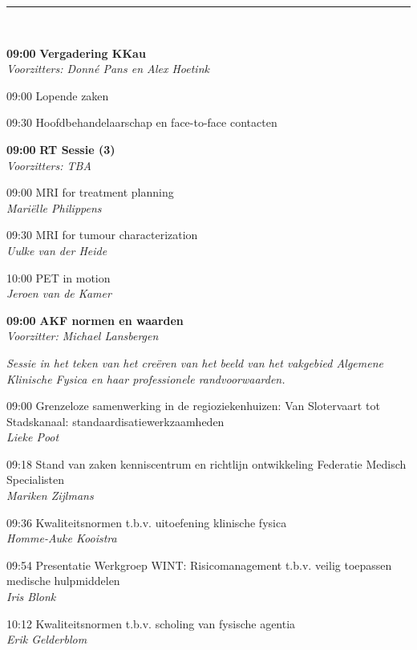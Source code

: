 \documentclass[a4paper,10pt]{report}
\begin{document}
\begin{multicols*}{3}
\vfill
\hrule\vspace{3mm}

\\
\vfill
{}
\begin{packed_enum}
\item[\textbf{09:00}] \textbf{Vergadering KKau}\\\textit{Voorzitters: Donn\'e Pans en Alex Hoetink}
\item[09:00] Lopende zaken
\item[09:30] Hoofdbehandelaarschap en face-to-face contacten 
\end{packed_enum}
\columnbreak

\begin{packed_enum}
\item[\textbf{09:00}] \textbf{RT Sessie (3)}\\\textit{Voorzitters: TBA}
\item[09:00] MRI for treatment planning\\\textit{Mariëlle Philippens}
\item[09:30] MRI for tumour characterization\\\textit{Uulke van der Heide}
\item[10:00] PET in motion\\\textit{Jeroen van de Kamer}
\end{packed_enum}

\vfill
{}
\begin{packed_enum}
\item[\textbf{09:00}] \textbf{AKF normen en waarden}\\\textit{Voorzitter: Michael Lansbergen}
\end{packed_enum}
\textit{Sessie in het teken van het cre\"eren van het beeld van het vakgebied Algemene Klinische Fysica en haar professionele randvoorwaarden.}
\begin{packed_enum}
\item[09:00] Grenzeloze samenwerking in de regioziekenhuizen: Van Slotervaart tot Stadskanaal: standaardisatiewerkzaamheden\\\textit{Lieke Poot}
\item[09:18] Stand van zaken kenniscentrum en richtlijn ontwikkeling Federatie Medisch Specialisten\\\textit{Mariken Zijlmans}
\item[09:36] Kwaliteitsnormen t\@.b\@.v\@. uitoefening klinische fysica\\\textit{Homme-Auke Kooistra} 
\item[09:54] Presentatie Werkgroep WINT: Risicomanagement t\@.b\@.v\@. veilig toepassen medische hulpmiddelen\\\textit{Iris Blonk}
\item[10:12] Kwaliteitsnormen t\@.b\@.v\@. scholing van fysische agentia\\\textit{Erik Gelderblom}
\end{packed_enum}


\end{multicols*}
\end{document}
